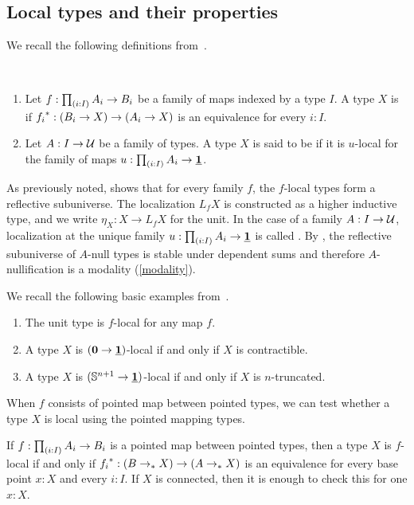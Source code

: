 \subsection{Local types and their properties}\label{ss:basic-properties}

We recall the following definitions from~\cite{RSS}.
\begin{defn}\ 
\begin{enumerate}
\item    Let $f: \prd{i:I} A_i \to B_i$ be a family of maps indexed by a type $I$.
    A type $X$ is \define{$f$-local} if
    ${f_i}^\ast : (B_i \to X) \to (A_i \to X)$ is an equivalence for every $i : I$.
\item Let $A:I\to\mathcal{U}$ be a family of types. A type $X$ is said to be \define{$A$-null} if it is $u$-local for the family of maps $u:\prd{i:I}A_i\to\unit$. 
\end{enumerate}
\end{defn} 

As previously noted, \cite[Theorem 2.16]{RSS} shows that for every
family $f$, the $f$-local types form a reflective subuniverse.
The localization $L_f X$ is constructed as a higher inductive type,
and we write $\eta_X : X \to L_f X$ for the unit.
In the case of a family $A:I\to\mathcal{U}$, localization at the unique family $u:\prd{i:I}A_i \to \unit$ is called .
By \cite[Theorem 2.17]{RSS}, the reflective subuniverse of $A$-null types is stable under dependent sums and therefore $A$-nullification is a modality (\cref{modality}).

\begin{eg} We recall the following basic examples from~\cite{RSS}.
\begin{enumerate}
\item The unit type is $f$-local for any map $f$.
\item A type $X$ is $(\mathbf{0}\to\underline{\mathbf{1}})$-local if and only if $X$ is contractible.
\item A type $X$ is $(\mathbb{S}^{n+1}\to\underline{\mathbf{1}})$-local if and only if $X$ is $n$-truncated.
\end{enumerate}
\end{eg}

When $f$ consists of pointed map between pointed types, we can test whether
a type $X$ is local using the pointed mapping types.

\begin{lem}\label{lemma:pointed}
    If $f : \prd{i:I} A_i \to B_i$ is a pointed map between pointed types,
    then a type $X$ is $f$-local if and only if
    ${f_i}^\ast : (B \to_{\ast} X) \to (A \to_{\ast} X)$ is an equivalence
    for every base point $x : X$ and every $i : I$.
    If $X$ is connected, then it is enough to check this for one $x : X$.
\end{lem}

